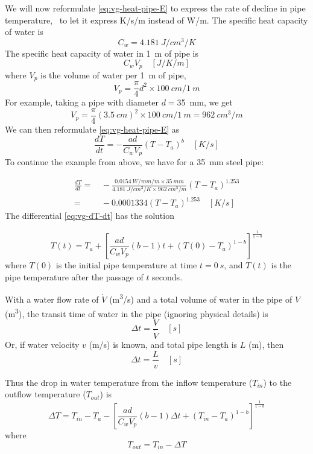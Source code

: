 We will now reformulate \cref{eq:vg-heat-pipe-E} to express the rate of decline in pipe temperature, \ie\ to let it express \si{K/s/m} instead of \si{W/m}. The specific heat capacity of water is
\[
  C_w = \SI{4.181}{J/cm^3/K} 
\]
The specific heat capacity of water in \SI{1}{m} of pipe is
\[
  C_w V_p \quad[\si{J/K/m}]
\]
where $V_p$ is the volume of water per \SI{1}{m} of pipe,
\[
  V_p = \frac{\pi}{4}d^2 \times \SI{100}{cm} / \SI{1}{m}
\]
For example, taking a pipe with diameter $d=$\SI{35}{mm}, we get
\[
  V_p = \frac{\pi}{4}\left(\SI{3.5}{cm}\right)^2 \times \SI{100}{cm} / \SI{1}{m} = \SI{962}{cm^3/m}
\]
We can then reformulate \cref{eq:vg-heat-pipe-E} as
\begin{equation}
  \frac{dT}{dt} = -\frac{ad}{C_w V_p}\left(T-T_a\right)^b \quad [\si{K/s}] 
  \label{eq:vg-dT-dt}
\end{equation}
To continue the example from above, we have for a \SI{35}{mm} steel pipe:

\begin{align*}
  \frac{dT}{dt} =&\, -\frac{\SI{0.0154}{W/mm/m}\times \SI{35}{mm}}{\SI{4.181}{J/cm^3/K}\times\SI{962}{cm^3/m}}\left(T-T_a\right)^{1.253} \\
                =&\, -0.0001334\left(T-T_a\right)^{1.253} \quad [\si{K/s}]
\end{align*}
The differential \cref{eq:vg-dT-dt} has the solution

\begin{equation}
  T(t) = T_a + \left[ \frac{ad}{C_w V_p}(b-1)t + \left( T(0)-T_a\right)^{1-b}  \right]^\frac{1}{1-b} 
\end{equation}
where $T(0)$ is the initial pipe temperature at time $t=\SI{0}{s}$, and $T(t)$ is the pipe temperature after the passage of $t$ seconds. 

With a water flow rate of $\dot{V}$ (\si{m^3/s}) and a total volume of water in the pipe of $V$ (\si{m^3}), the transit time of water in the pipe (ignoring physical details) is 
\[
  \Delta t = \frac{V}{\dot{V}} \quad [\si{s}]
\]
Or, if water velocity $v$ (\si{m/s}) is known, and total pipe length is $L$ (\si{m}), then
\[
  \Delta t = \frac{L}{v} \quad [\si{s}]
\]


Thus the drop in water temperature from the inflow temperature ($T_{in}$) to the outflow temperature ($T_{out}$) is
\begin{equation}
  \Delta T = T_{in} - T_a - \left[ \frac{ad}{C_w V_p}(b-1)\Delta t + \left( T_{in}-T_a\right)^{1-b}  \right]^\frac{1}{1-b} 
  \label{eq:vg-DT}
\end{equation}
where
\[
  T_{out} = T_{in}-\Delta T
\]

